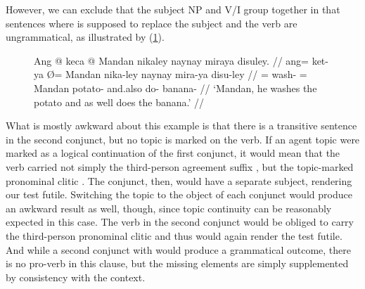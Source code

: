 \begin{figure}

\xe
\end{figure}

However, we can exclude that the subject NP and V/I group together in that
sentences where  is supposed to replace the subject and
the verb are ungrammatical, as illustrated by (\ref{ex:ayrvconst4}).

\begin{figure}[h]
\ex\label{ex:ayrvconst4}%
\ljudge*\begingl
\gla Ang @ keca {} @ Mandan nikaley naynay miraya disuley. //
\glb ang= ket-ya Ø= Mandan nika-ley naynay mira-ya disu-ley //
\glc \AgtT{}= wash-\TsgM{} \Top{}= Mandan potato-\PargI{} and.also do-\TsgM{}
	banana-\PargI{} //
\glft `Mandan, he washes the potato and as well does the banana.' //
\endgl\xe
\end{figure}

What is mostly awkward about this example is that there is a transitive
sentence in the second conjunct, but no topic is marked on the verb. If an
agent topic were marked as a logical continuation of the first conjunct, it
would mean that the verb carried not simply the third-person agreement suffix
, but the topic-marked pronominal clitic
. The conjunct, then, would have a separate subject,
rendering our test futile. Switching the topic to the object of each conjunct
would produce an awkward result as well, though, since topic continuity can be
reasonably expected in this case. The verb in the second conjunct would be
obliged to carry the third-person pronominal clitic 
and thus would again render the test futile. And while a second conjunct with
 would produce a
grammatical outcome, there is no pro-verb in this clause, but the missing
elements are simply supplemented by consistency with the context.

